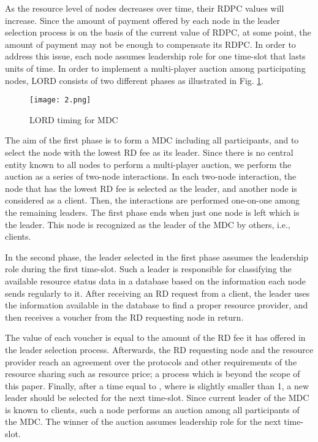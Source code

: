 \documentclass[journal,12pt, onecolumn]{IEEEtran}
\begin{document}
As the resource level of nodes decreases over time, their RDPC values will increase. Since the amount of payment offered by each node in the leader selection process is on the basis of the current value of RDPC, at some point, the amount of payment may not be enough to compensate its RDPC. In order to address this issue, each node assumes leadership role for one time-slot that lasts  units of time.
In order to implement a multi-player auction among participating nodes, LORD consists of two different phases as illustrated in Fig. \ref{figure 5}. 



\begin{figure}[b]
\begin{center}
\texttt{[image: 2.png]}
\caption{LORD timing for MDC}
\label{figure 5}
\end{center}
\end{figure}

The aim of the first phase is to form a MDC including all participants, and to select the node with the lowest RD fee as its leader. Since there is no central entity known to all nodes to perform a multi-player auction, 
we perform the auction as a series of two-node interactions. In each two-node interaction, the node that has the lowest RD fee is selected as the leader, and another node is considered as a client. Then, the interactions are performed one-on-one among the remaining leaders. The first phase ends when just one node is left which is the leader. This node is recognized as the leader of the MDC by others, i.e., clients.

In the second phase, the leader selected in the first phase assumes the leadership role during the first time-slot. Such a leader is responsible for classifying the available resource status data in a database based on the information each node sends regularly to it. After receiving an RD request from a client, the leader uses the information available in the database to find a proper resource provider, and then receives a voucher from the RD requesting node in return. 

The value of each voucher is equal to the amount of the RD fee it has offered in the leader selection process. Afterwards, the RD requesting node and the resource provider reach an agreement over the protocols and other requirements of the resource sharing such as resource price; a process which is beyond the scope of this paper. Finally, after a time equal to , where  is slightly smaller than 1, a new leader should be selected for the next time-slot. Since current leader of the MDC is known to clients, such a node performs an auction among all participants of the MDC. The winner of the auction assumes leadership role for the next time-slot.
\end{document}
